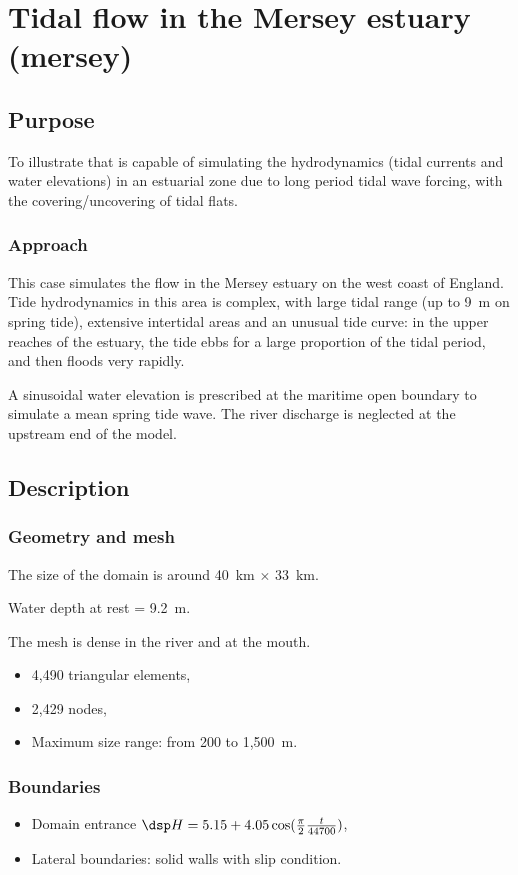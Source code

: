 \chapter{Tidal flow in the Mersey estuary (mersey) }
\section{Purpose}
To illustrate that  is capable of simulating the hydrodynamics
(tidal currents and water elevations) in an estuarial zone due to long
period tidal wave forcing, with the covering/uncovering of tidal flats.

\subsection{Approach}
This case simulates the flow in the Mersey estuary on the west coast of
England. Tide hydrodynamics in this area is complex, with large tidal
range (up to 9~m on spring tide), extensive intertidal areas and an unusual
tide curve: in the upper reaches of the estuary, the tide ebbs for a large
proportion of the tidal period, and then floods very rapidly.

A sinusoidal water elevation is prescribed at the maritime open boundary
to simulate a mean spring tide wave.
The river discharge is neglected at the upstream end of the model.

\section{Description}

\subsection{Geometry and mesh}
The size of the domain is around 40~km $\times$ 33~km.

Water depth at rest = 9.2~m.

The mesh is dense in the river and at the mouth.
\begin{itemize}
\item 4,490 triangular elements,
\item 2,429 nodes,
\item Maximum size range: from 200 to 1,500~m.
\end{itemize}

\subsection{Boundaries}
\begin{itemize}
\item Domain entrance $\dsp H = 5.15+4.05\cos(\frac{\pi}{2}\frac{t}{44700})$,
\item Lateral boundaries: solid walls with slip condition.
\end{itemize}

